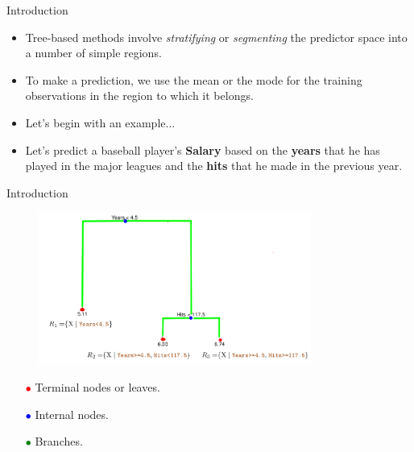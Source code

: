 \begin{frame}{Introduction}
\small
\begin{itemize}
    \item Tree-based methods involve \textit{stratifying} or \textit{segmenting} the predictor space into a number of simple regions. \pause

    \item To make a prediction, we use the mean or the mode for the training observations in the region to which it belongs. \pause 

    \item Let's begin with an example... 

    \item Let's predict a baseball player's \textbf{Salary} based on the \textbf{years} that he has played in the major leagues and the \textbf{hits} that he made in the previous year. 

    \end{itemize}
\end{frame}

\begin{frame}{Introduction}

    \begin{figure}
        \centering
        \includegraphics[height=5cm]{introduction/trees.png}
    \end{figure}
\begin{itemize}

\item[\textcolor{red}{$\bullet$}] Terminal nodes or leaves. 
\item[\textcolor{blue}{$\bullet$}]Internal nodes. 
\item[\textcolor{green}{$\bullet$}] Branches. 
\end{itemize}

\end{frame}






